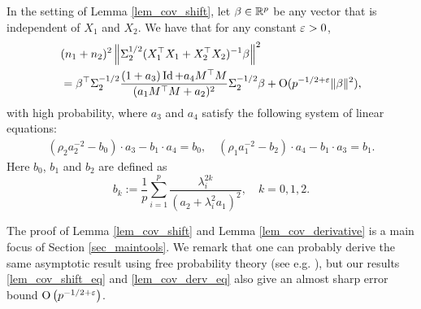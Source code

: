 \begin{lemma}\label{lem_cov_derivative}
In the setting of Lemma \ref{lem_cov_shift}, let $\beta \in \mathbb{R}^p$ be any vector that is independent of $X_1$ and $X_2$. We have that for any constant ${\varepsilon}>0$,
\begin{equation}\label{lem_cov_derv_eq}
\begin{split}
&(n_1+n_2)^2\left\| \Sigma_2^{1/2} (X_1^{\top}X_1 + X_2^{\top}X_2)^{-1}\beta \right\|^2 \\
&= \beta^{\top} \Sigma_2^{-1/2}  \frac{(1 + a_3)\operatorname{Id} + a_4 {M}^{\top}{M}}{( a_1 {M}^{\top}{M}+a_2)^2} \Sigma_2^{-1/2} \beta +\operatorname{O}(p^{-1/2+{\varepsilon}}\|\beta\|^2),
\end{split}
\end{equation}
with high probability, where $a_{3}$ and $a_4$ satisfy the following system of linear equations: 
\begin{gather}\label{eq_a34extra}
		\left(\rho_2  a_2^{-2}-  b_0\right)\cdot  a_3 - b_1 \cdot  a_4
		= b_0, \quad \left(\rho_1 a_1^{-2} -  b_2  \right)\cdot  a_4 -  b_1 \cdot  a_3 = b_1 .  
	\end{gather}
Here $b_0$, $b_1$ and $b_2$ are defined as
$$ b_k:= \frac1{p}\sum_{i=1}^p \frac{ \lambda_i^{2k}}{ ( a_2 + \lambda_i^2 a_1)^2  },\quad k=0,1,2.$$
\end{lemma}

The proof of Lemma \ref{lem_cov_shift} and Lemma \ref{lem_cov_derivative} is a main focus of Section \ref{sec_maintools}. We remark that one can probably derive the same asymptotic result using free probability theory (see e.g. \cite{nica2006lectures}), but our results \eqref{lem_cov_shift_eq} and \eqref{lem_cov_derv_eq} also give an almost sharp error bound $\operatorname{O}\left( p^{-1/2+\varepsilon}\right)$.


